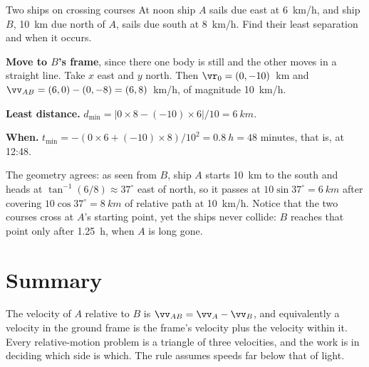 \begin{exbox}{Two ships on crossing courses}
At noon ship $A$ sails due east at \SI{6}{km/h}, and ship $B$, \SI{10}{km} due north of $A$, sails due
south at \SI{8}{km/h}. Find their least separation and when it occurs.

 \textbf{Move to $B$'s frame}, since there one body is still and the other moves in a straight
line. Take $x$ east and $y$ north. Then $\vr_0=(0,-10)$~\si{km} and
$\vv_{AB}=(6,0)-(0,-8)=(6,8)$~\si{km/h}, of magnitude \SI{10}{km/h}.

 \textbf{Least distance.} $d_{\min}=|0\times8-(-10)\times6|/10=\SI{6}{km}$.

 \textbf{When.} $t_{\min}=-(0\times6+(-10)\times8)/10^2=\SI{0.8}{h}=48$ minutes, that is, at
12:48.

The geometry agrees: as seen from $B$, ship $A$ starts \SI{10}{km} to the south and heads at
$\tan^{-1}(6/8)\approx37^\circ$ east of north, so it passes at $10\sin37^\circ=\SI{6}{km}$ after covering
$10\cos37^\circ=\SI{8}{km}$ of relative path at \SI{10}{km/h}. Notice that the two courses cross at
$A$'s starting point, yet the ships never collide: $B$ reaches that point only after \SI{1.25}{h}, when
$A$ is long gone.
\end{exbox}

\section{Summary}\label{sec:summary5}
The velocity of $A$ relative to $B$ is $\vv_{AB}=\vv_A-\vv_B$, and equivalently a velocity in the
ground frame is the frame's velocity plus the velocity within it. Every relative-motion problem is a
triangle of three velocities, and the work is in deciding which side is which. The rule assumes
speeds far below that of light.

